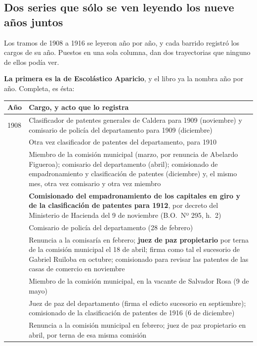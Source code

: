 \subsection*{Dos series que sólo se ven leyendo los nueve años juntos}

Los tramos de 1908 a 1916 se leyeron año por año, y cada barrido registró los cargos de su año. Puestos
en una sola columna, dan dos trayectorias que ninguno de ellos podía ver.

\textbf{La primera es la de Escolástico Aparicio}, y el libro ya la
nombra año por año. Completa, es ésta:

{\footnotesize
\begin{longtable}{@{}p{1.1cm}p{11.4cm}@{}}
\toprule
\textbf{Año} & \textbf{Cargo, y acto que lo registra} \\
\midrule
\endhead
1908 & Clasificador de patentes generales de Caldera para 1909 (noviembre) y comisario de policía del departamento para 1909 (diciembre) \\
\addlinespace
1909 & Otra vez clasificador de patentes del departamento, para 1910 \\
\addlinespace
1910 & Miembro de la comisión municipal (marzo, por renuncia de Abelardo Figueroa\index{Figueroa, Abelardo}); comisario del departamento (abril); comisionado de empadronamiento y clasificación de patentes (diciembre) y, el mismo mes, otra vez comisario y otra vez miembro \\
\addlinespace
1911 & \textbf{Comisionado del empadronamiento de los capitales en giro y de la clasificación de patentes para 1912}, por decreto del Ministerio de Hacienda del 9 de noviembre (B.O.\ Nº 295, h.\ 2) \\
\addlinespace
1912 & Comisario de policía del departamento (28 de febrero) \\
\addlinespace
1913 & Renuncia a la comisaría en febrero; \textbf{juez de paz propietario} por terna de la comisión municipal el 18 de abril; firma como tal el sucesorio de Gabriel Ruiloba en octubre; comisionado para revisar las patentes de las casas de comercio en noviembre \\
\addlinespace
1914 & Miembro de la comisión municipal, en la vacante de Salvador Rosa\index{Rosa, Salvador} (9 de mayo) \\
\addlinespace
1915 & Juez de paz del departamento (firma el edicto sucesorio en septiembre); comisionado de la clasificación de patentes de 1916 (6 de diciembre) \\
\addlinespace
1916 & Renuncia a la comisión municipal en febrero; juez de paz propietario en abril, por terna de esa misma comisión \\
\bottomrule
\end{longtable}
}

